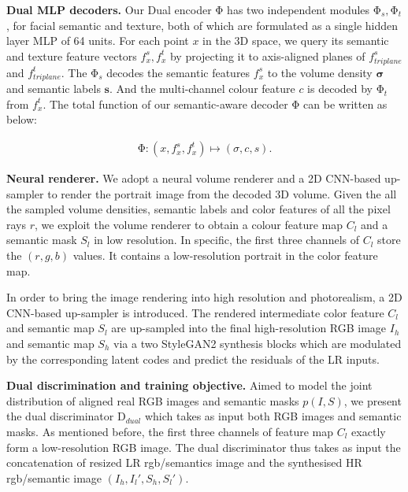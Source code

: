 \documentclass[acmtog]{acmart}
\begin{document}
\noindent \textbf{Dual MLP decoders.} 
Our Dual encoder $\mathrm{\Phi}$ has two independent modules $\mathrm{\Phi}_{s}, \mathrm{\Phi}_{t}$, for facial semantic and texture, both of which are formulated as a single hidden layer MLP of 64 units.
For each point $x$ in the 3D space, we query its semantic and texture feature vectors $f^{s}_{x}, f^{t}_{x}$ by projecting it to axis-aligned planes of $f^{s}_{triplane}$ and $f^{t}_{triplane}$. The $\mathrm{\Phi}_{s}$ decodes the semantic features $f^{s}_{x}$ to the volume density $\mathbf{\sigma}$ and semantic labels $\mathbf{s}$. And the multi-channel colour feature $c$ is decoded  by $\mathrm{\Phi}_{t}$ from $f^{t}_{x}$. The total function of our semantic-aware decoder $\mathrm{\Phi}$ can be written as below:


\begin{equation}
    \begin{split}
     \mathrm{\Phi}: 
     (x, f^{s}_{x}, f^{t}_{x}) \mapsto (\sigma, c, s).
    \end{split}
\end{equation}

\noindent \textbf{Neural renderer.} We adopt a neural volume renderer and a 2D CNN-based up-sampler to render the portrait image from the decoded 3D volume. Given the all the sampled volume densities, semantic labels and color features of all the pixel rays $r$, we exploit the volume renderer to obtain a colour feature map $C_l$ and a semantic mask $S_l$ in low resolution. In specific, the first three channels of $C_l$ store the $(r,g,b)$ values. It contains a low-resolution portrait in the color feature map.





In order to bring the image rendering into high resolution and photorealism, a 2D CNN-based up-sampler is introduced. The rendered intermediate color feature $C_l$ and semantic map $S_l$ are up-sampled into the final high-resolution RGB image $I_h$ and semantic map $S_h$ via a two StyleGAN2 synthesis blocks which are modulated by the corresponding latent codes and predict the residuals of the LR inputs.

\noindent \textbf{Dual discrimination and training objective.} Aimed to model the joint distribution of aligned real RGB images and semantic masks $p(I, S)$, we present the dual discriminator $\mathrm{D}_{dual}$ which takes as input both RGB images and semantic masks. As mentioned before, the first three channels of feature map $C_l$ exactly form a low-resolution RGB image.  The dual discriminator thus takes as input the concatenation of resized LR rgb/semantics image and the synthesised HR rgb/semantic image $(I_h, I_l', S_h, S_l')$.
\end{document}
